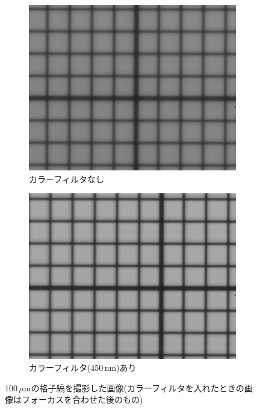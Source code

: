 \documentclass[titlepage]{jsarticle}
\begin{document}
\begin{figure}[htbp]
    \centering
    \begin{subfigure}{0.4\columnwidth}
        \centering
        \includegraphics[width=\columnwidth]{100um_white.png}
        \caption{カラーフィルタなし}
        \label{fig:100white}
    \end{subfigure}
    \begin{subfigure}{0.4\columnwidth}
        \centering
        \includegraphics[width=\columnwidth]{100um_blue.png}
        \caption{カラーフィルタ(450\,nm)あり}
        \label{fig:100blue}
    \end{subfigure}    
    \caption{100\,$\mu$mの格子縞を撮影した画像(カラーフィルタを入れたときの画像はフォーカスを合わせた後のもの)}
    \label{fig:100}
\end{figure}
\end{document}

